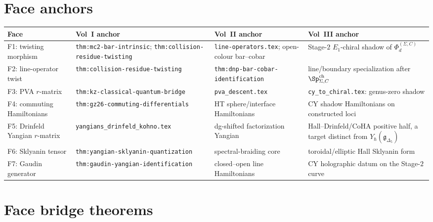 \section{Face anchors}
\label{sec:master-concordance-face-locations}

\begin{center}
\renewcommand{\arraystretch}{1.35}
\begin{tabular}{|p{2.8cm}|p{3.5cm}|p{3.5cm}|p{3.5cm}|}
\hline
\textbf{Face} & \textbf{Vol~I anchor} & \textbf{Vol~II anchor}
& \textbf{Vol~III anchor} \\
\hline\hline
F1: twisting morphism &
\texttt{thm:mc2-bar-intrinsic};
\texttt{thm:collision-residue-twisting} &
\texttt{line-operators.tex};
open-colour bar--cobar &
Stage-$2$ $E_1$-chiral shadow of
$\Phi_d^{(\Sigma,C)}$ \\
\hline
F2: line-operator twist &
\texttt{thm:collision-residue-twisting} &
\texttt{thm:dnp-bar-cobar-identification} &
line/boundary specialization after $\Sp^{\mathrm{ch}}_{\Sigma,C}$ \\
\hline
F3: PVA $r$-matrix &
\texttt{thm:kz-classical-quantum-bridge} &
\texttt{pva\_descent.tex} &
\texttt{cy\_to\_chiral.tex}: genus-zero shadow \\
\hline
F4: commuting Hamiltonians &
\texttt{thm:gz26-commuting-differentials} &
HT sphere/interface Hamiltonians &
CY shadow Hamiltonians on constructed loci \\
\hline
F5: Drinfeld Yangian $r$-matrix &
\texttt{yangians\_drinfeld\_kohno.tex} &
dg-shifted factorization Yangian &
Hall--Drinfeld/CoHA positive half, a target distinct from
$Y_\hbar(\mathfrak g_{\Delta_5})$ \\
\hline
F6: Sklyanin tensor &
\texttt{thm:yangian-sklyanin-quantization} &
spectral-braiding core &
toroidal/elliptic Hall Sklyanin form \\
\hline
F7: Gaudin generator &
\texttt{thm:gaudin-yangian-identification} &
closed--open line Hamiltonians &
CY holographic datum on the Stage-$2$ curve \\
\hline
\end{tabular}
\end{center}

\section{Face bridge theorems}
\label{sec:master-concordance-new-theorems}


